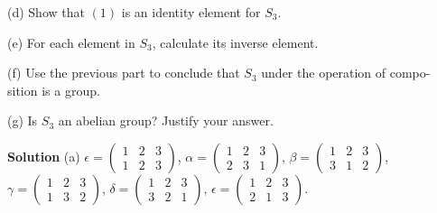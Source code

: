 \documentclass[12pt, a4paper]{article}
\begin{document}
\begin{flushleft}
\begin{flushleft}
\hspace*{10mm}(d) Show that $(1)$ is an identity element for $S_3$.\linebreak

\hspace*{10mm}(e) For each element in $S_3$, calculate its inverse element.\linebreak

\hspace*{10mm}(f) Use the previous part to conclude that $S_3$ under the operation of compo-\linebreak
\hspace*{16.7mm}sition is a group.\linebreak

\hspace*{10mm}(g) Is $S_3$ an abelian group? Justify your answer.\linebreak

\end{flushleft}


\begin{flushleft}

\textbf{Solution}\vspace*{3mm}\linebreak
\hspace*{10mm}(a)\vspace*{8mm}\linebreak
\hspace*{28mm}$\epsilon=\left (\begin{array}{ccc} 1 & 2 & 3 \\ 1 & 2 & 3 \end{array} \right)$, 
$\alpha=\left (\begin{array}{ccc} 1 & 2 & 3 \\ 2 & 3 & 1 \end{array} \right)$, 
$\beta=\left (\begin{array}{ccc} 1 & 2 & 3 \\ 3 & 1 & 2 \end{array} \right)$,\vspace*{10mm}\linebreak
\hspace*{27.5mm}$\gamma=\left (\begin{array}{ccc} 1 & 2 & 3 \\ 1 & 3 & 2 \end{array} \right)$, 
\hspace*{1mm}$\delta=\left (\begin{array}{ccc} 1 & 2 & 3 \\ 3 & 2 & 1 \end{array} \right)$, 
\hspace*{1mm}$\epsilon=\left (\begin{array}{ccc} 1 & 2 & 3 \\ 2 & 1 & 3 \end{array} \right)$.\vspace*{14mm}\linebreak



\end{flushleft}
\end{flushleft}
\end{document}
